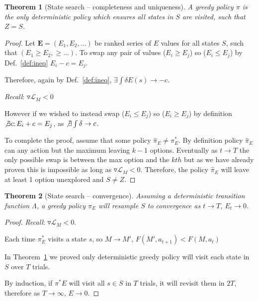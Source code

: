 \documentclass[9pt,twocolumn,twoside]{pnas-new}
\newtheorem{theorem}{Theorem}
\begin{document}
\begin{theorem}[State search -- completeness and uniqueness] \label{theorem:Z}
A greedy policy $\pi$ is the only deterministic policy which ensures all states in $S$ are visited, such that $Z = S$.
\end{theorem}
\begin{proof}    
    Let $\mathbf{E} = (E_1, E_2, ...)$ be ranked series of $E$ values for all states $S$, such that $(E_1 \geq E_2, \geq ...)$. To swap any pair of values ($E_i \geq E_j$) so ($E_i \leq E_j$) by Def.~\ref{def:ineq} $E_i - c = E_j$.  

    Therefore, again by Def.~\ref{def:ineq}, $\exists \int \delta E(s) \rightarrow -c$. 

    \textit{Recall}: $\triangledown \mathcal{L}_M < 0$

    However if we wished to instead swap ($E_i \leq E_j$) so ($E_i \geq E_j$) by definition $\not \exists c; E_i + c = E_j$, as $\not \exists \int \delta \rightarrow c$. 

    To complete the proof, assume that some policy $\hat \pi_E \neq \pi^*_E$. By definition policy $\hat \pi_E$ can any action but the maximum leaving $k-1$ options. Eventually as $t \rightarrow T$ the only possible swap is between the max option and the $kth$ but as we have already proven this is impossible as long as $\triangledown \mathcal{L}_M < 0$. Therefore, the policy $\hat \pi_E$ will leave at least 1 option unexplored and $S \neq Z$.
\end{proof}

\begin{theorem}[State search -- convergence] \label{theorem:convergence}
    Assuming a deterministic transition function $\Lambda$, a greedy policy $\pi_E$ will resample $S$ to convergence as $t \rightarrow T$, $E_t \rightarrow 0$.
\end{theorem}
\begin{proof}
    \textit{Recall}: $\triangledown \mathcal{L}_M < 0$. 

    Each time $\pi^*_E$ visits a state $s$, so $M \rightarrow M'$, $F(M', a_{t+1}) < F(M, a_t)$

    In Theorem~\ref{theorem:Z} we proved only deterministic greedy policy will visit each state in $S$ over $T$ trials.
    
    By induction, if $\pi^*E$ will visit all $s \in S$ in $T$ trials, it will revisit them in $2T$, therefore as $T \rightarrow \infty$, $E \rightarrow 0$. 
\end{proof}
\end{document}
